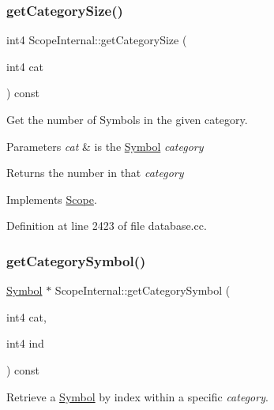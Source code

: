 \subsubsection{\texorpdfstring{getCategorySize()}{getCategorySize()}}
{\footnotesize\ttfamily int4 Scope\+Internal\+::get\+Category\+Size (\begin{DoxyParamCaption}\item[{int4}]{cat }\end{DoxyParamCaption}) const\hspace{0.3cm}{\ttfamily [virtual]}}



Get the number of Symbols in the given category. 


\begin{DoxyParams}{Parameters}
{\em cat} & is the \mbox{\hyperlink{class_symbol}{Symbol}} {\itshape category} \\
\hline
\end{DoxyParams}
\begin{DoxyReturn}{Returns}
the number in that {\itshape category} 
\end{DoxyReturn}


Implements \mbox{\hyperlink{class_scope_a909e15a7a96c9b402855b56b6bfdbd9f}{Scope}}.



Definition at line 2423 of file database.\+cc.

\mbox{\label{class_scope_internal_af0414fde624b56947bfa25863ea1a01e}} 
\subsubsection{\texorpdfstring{getCategorySymbol()}{getCategorySymbol()}}
{\footnotesize\ttfamily \mbox{\hyperlink{class_symbol}{Symbol}} $\ast$ Scope\+Internal\+::get\+Category\+Symbol (\begin{DoxyParamCaption}\item[{int4}]{cat,  }\item[{int4}]{ind }\end{DoxyParamCaption}) const\hspace{0.3cm}{\ttfamily [virtual]}}



Retrieve a \mbox{\hyperlink{class_symbol}{Symbol}} by index within a specific {\itshape category}. 


